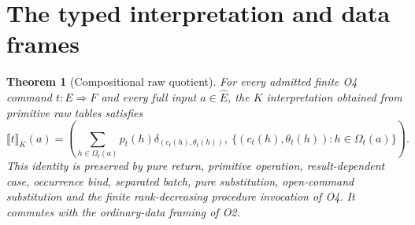 \documentclass[11pt,a4paper]{article}
\newtheorem{theorem}{Theorem}[section]
\theoremstyle{definition}
\newcommand{\den}[1]{\llbracket #1\rrbracket}
\begin{document}
\section{The typed interpretation and data frames}\label{sec:interpretation}
\begin{theorem}[Compositional raw quotient]\label{thm:interpretation}
For every admitted finite O4 command $t:E\Rightarrow F$ and every full
input $a\in\widehat E$, the $K$ interpretation obtained from primitive
raw tables satisfies
\begin{equation}\label{eq:interpretation}
 \den{t}_K(a)=
 \left(\sum_{h\in\Omega_t(a)}p_t(h)\delta_{(c_t(h),\theta_t(h))},\
       \{(c_t(h),\theta_t(h)):h\in\Omega_t(a)\}\right).
\end{equation}
This identity is preserved by pure return, primitive operation,
result-dependent case, occurrence bind, separated batch, pure
substitution, open-command substitution and the finite rank-decreasing
procedure invocation of O4. It commutes with the ordinary-data framing
of O2.
\end{theorem}
\end{document}
